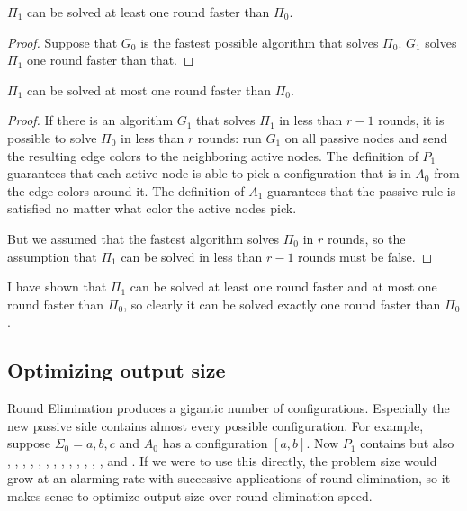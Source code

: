 \documentclass[english, 12pt, a4paper, sci, a-1b, online]{aaltothesis}
\begin{document}
\begin{lemma}
  $\Pi_1$ can be solved at least one round faster than $\Pi_0$.
\end{lemma}
\begin{proof}
  Suppose that $G_0$ is the fastest possible algorithm that solves $\Pi_0$. $G_1$ solves $\Pi_1$ one round faster than that.
\end{proof}

\begin{lemma}
  $\Pi_1$ can be solved at most one round faster than $\Pi_0$.
\end{lemma}
\begin{proof}
  If there is an algorithm $G_1$ that solves $\Pi_1$ in less than $r-1$ rounds, it is possible to solve $\Pi_0$ in less than $r$ rounds: run $G_1$ on all passive nodes and send the resulting edge colors to the neighboring active nodes. The definition of $P_1$ guarantees that each active node is able to pick a configuration that is in $A_0$ from the edge colors around it. The definition of $A_1$ guarantees that the passive rule is satisfied no matter what color the active nodes pick.

  But we assumed that the fastest algorithm solves $\Pi_0$ in $r$ rounds, so the assumption that $\Pi_1$ can be solved in less than $r-1$ rounds must be false.
\end{proof}

I have shown that $\Pi_1$ can be solved at least one round faster and at most one round faster than $\Pi_0$, so clearly it can be solved exactly one round faster than $\Pi_0$.

\subsection{Optimizing output size}

Round Elimination produces a gigantic number of configurations. Especially the new passive side contains almost every possible configuration. For example, suppose $\Sigma_{0} = {a, b, c}$ and $A_0$ has a configuration $[a, b]$. Now $P_{1}$ contains  but also , , , , , , , , , , , , ,  and . If we were to use this directly, the problem size would grow at an alarming rate with successive applications of round elimination, so it makes sense to optimize output size over round elimination speed.
\end{document}
